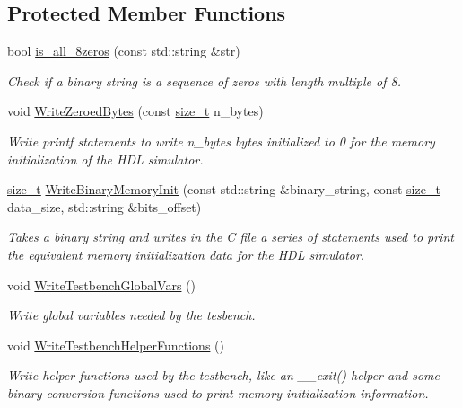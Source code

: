 \subsection*{Protected Member Functions}
\begin{DoxyCompactItemize}
\item 
bool \hyperlink{classHLSCWriter_aa5a58a39f5515f512fd0ed0bebf3c908}{is\+\_\+all\+\_\+8zeros} (const std\+::string \&str)
\begin{DoxyCompactList}\small\item\em Check if a binary string is a sequence of zeros with length multiple of 8. \end{DoxyCompactList}\item 
void \hyperlink{classHLSCWriter_a38348640f023a8c42330e4131263ece8}{Write\+Zeroed\+Bytes} (const \hyperlink{tutorial__fpt__2017_2intro_2sixth_2test_8c_a7c94ea6f8948649f8d181ae55911eeaf}{size\+\_\+t} n\+\_\+bytes)
\begin{DoxyCompactList}\small\item\em Write printf statements to write n\+\_\+bytes bytes initialized to 0 for the memory initialization of the H\+DL simulator. \end{DoxyCompactList}\item 
\hyperlink{tutorial__fpt__2017_2intro_2sixth_2test_8c_a7c94ea6f8948649f8d181ae55911eeaf}{size\+\_\+t} \hyperlink{classHLSCWriter_a8fd01f9eda521085a428e6c46e4dc871}{Write\+Binary\+Memory\+Init} (const std\+::string \&binary\+\_\+string, const \hyperlink{tutorial__fpt__2017_2intro_2sixth_2test_8c_a7c94ea6f8948649f8d181ae55911eeaf}{size\+\_\+t} data\+\_\+size, std\+::string \&bits\+\_\+offset)
\begin{DoxyCompactList}\small\item\em Takes a binary string and writes in the C file a series of statements used to print the equivalent memory initialization data for the H\+DL simulator. \end{DoxyCompactList}\item 
void \hyperlink{classHLSCWriter_a5fdaae40bf4d22a922ce36aa8439f92b}{Write\+Testbench\+Global\+Vars} ()
\begin{DoxyCompactList}\small\item\em Write global variables needed by the tesbench. \end{DoxyCompactList}\item 
void \hyperlink{classHLSCWriter_a6eb118ed175fcbc9d2ab94c8e71ce420}{Write\+Testbench\+Helper\+Functions} ()
\begin{DoxyCompactList}\small\item\em Write helper functions used by the testbench, like an \+\_\+\+\_\+exit() helper and some binary conversion functions used to print memory initialization information. \end{DoxyCompactList}\item 

\end{DoxyCompactItemize}
